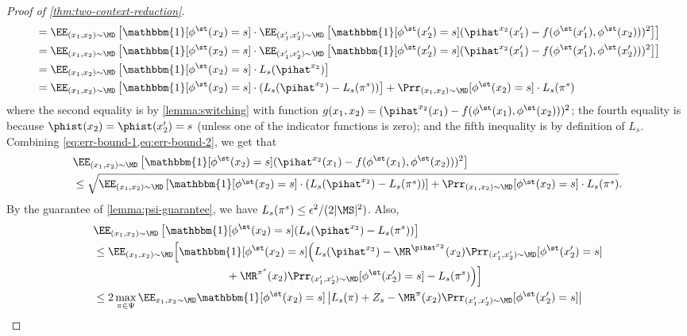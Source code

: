 \begin{proof}[Proof of \cref{thm:two-context-reduction}]
\begin{align}
&= \EE_{(x_1,x_2) \sim \MD}\left[\mathbbm{1}[\phi^\st(x_2)=s] \cdot \EE_{(x_1',x_2') \sim \MD}\left[\mathbbm{1}[\phi^\st(x_2') = s]  (\pihat^{x_2}(x_1') - f(\phi^\st(x_1'),\phi^\st(x_2)))^2\right]\right] \nonumber \\
&= \EE_{(x_1,x_2) \sim \MD}\left[\mathbbm{1}[\phi^\st(x_2)=s] \cdot \EE_{(x_1',x_2') \sim \MD}\left[\mathbbm{1}[\phi^\st(x_2') = s]  (\pihat^{x_2}(x_1') - f(\phi^\st(x_1'),\phi^\st(x_2')))^2\right]\right] \nonumber \\
&= \EE_{(x_1,x_2) \sim \MD}\left[ \mathbbm{1}[\phi^\st(x_2)=s]\cdot L_s(\pihat^{x_2}) \right]\nonumber \\ 
&= \EE_{(x_1,x_2) \sim \MD} \left[\mathbbm{1}[\phi^\st(x_2)=s] \cdot \left(L_s(\pihat^{x_2}) - L_s(\pi^s)\right)\right] + \Prr_{(x_1,x_2) \sim \MD}[\phi^\st(x_2) = s]\cdot L_s(\pi^s)
\label{eq:err-bound-2}
\end{align}
where the second equality is by \cref{lemma:switching} with function $g(x_1,x_2) = (\pihat^{x_2}(x_1) - f(\phi^\st(x_1),\phi^\st(x_2)))^2$; the fourth equality is because $\phist(x_2) = \phist(x_2') = s$ (unless one of the indicator functions is zero); and the fifth inequality is by definition of $L_s$. Combining \cref{eq:err-bound-1,eq:err-bound-2}, we get that
\begin{align}
&\EE_{(x_1,x_2) \sim \MD}\left[ \mathbbm{1}[\phi^\st(x_2) = s] (\pihat^{x_2}(x_1) - f(\phi^\st(x_1),\phi^\st(x_2)))^2 \right]\nonumber \\ 
&\leq \sqrt{\EE_{(x_1,x_2) \sim \MD} \left[\mathbbm{1}[\phi^\st(x_2)=s] \cdot \left(L_s(\pihat^{x_2}) - L_s(\pi^s)\right) \right] + \Prr_{(x_1,x_2) \sim \MD}[\phi^\st(x_2) = s]\cdot L_s(\pi^s)}.
\label{eq:err-bound}
\end{align}
By the guarantee of \cref{lemma:psi-guarantee}, we have $L_s(\pi^s) \leq \epsilon^2/(2|\MS|^2)$. Also,
\begin{align*}
&\EE_{(x_1,x_2) \sim \MD} \left[\mathbbm{1}[\phi^\st(x_2)=s] (L_s(\pihat^{x_2}) - L_s(\pi^s))\right] \\ 
&\leq \EE_{(x_1,x_2) \sim \MD} \Big[\mathbbm{1}[\phi^\st(x_2)=s] \Big(L_s(\pihat^{x_2}) - \MR^{\pihat^{x_2}}(x_2)\Prr_{(x_1',x_2')\sim\MD}[\phi^\st(x_2')=s] \\
&\hspace{12em}+ \MR^{\pi^s}(x_2)\Prr_{(x_1',x_2')\sim\MD}[\phi^\st(x_2')=s] - L_s(\pi^s)\Big)\Big] \\ 
&\leq 2\max_{\pi\in\Psi} \EE_{x_1,x_2\sim\MD} \mathbbm{1}[\phi^\st(x_2)=s] \left| L_s(\pi)+Z_s - \MR^\pi(x_2)\Prr_{(x_1',x_2')\sim\MD}[\phi^\st(x_2')=s]\right| \\ 

\end{align*}
\end{proof}
